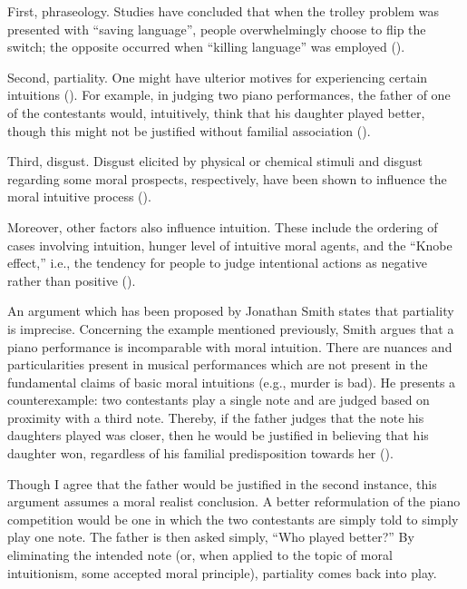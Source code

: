 First, phraseology. Studies have concluded that when the trolley problem was presented with “saving language”, people overwhelmingly choose to flip the switch; the opposite occurred when “killing language” was employed (\cite[p.\ 6]{bengson2013experimental}).

Second, partiality. One might have ulterior motives for experiencing certain intuitions (\cite[pp.\ 343–346]{sinnott2006moral}). For example, in judging two piano performances, the father of one of the contestants would, intuitively, think that his daughter played better, though this might not be justified without familial association (\cite[p.\ 343]{sinnott2006moral}).

Third, disgust. Disgust elicited by physical or chemical stimuli and disgust regarding some moral prospects, respectively, have been shown to influence the moral intuitive process (\cite[p.\ 8]{tao2022effects}).

Moreover, other factors also influence intuition. These include the ordering of cases involving intuition, hunger level of intuitive moral agents, and the “Knobe effect,” i.e., the tendency for people to judge intentional actions as negative rather than positive (\cites{swain2008instability}[p.\ 1]{danziger2011extraneous}).

An argument which has been proposed by Jonathan Smith states that partiality is imprecise. Concerning the example mentioned previously, Smith argues that a piano performance is incomparable with moral intuition. There are nuances and particularities present in musical performances which are not present in the fundamental claims of basic moral intuitions (e.g., murder is bad). He presents a counterexample: two contestants play a single note and are judged based on proximity with a third note. Thereby, if the father judges that the note his daughters played was closer, then he would be justified in believing that his daughter won, regardless of his familial predisposition towards her (\cite[p.\ 77]{smith2010sinnott}).

Though I agree that the father would be justified in the second instance, this argument assumes a moral realist conclusion. A better reformulation of the piano competition would be one in which the two contestants are simply told to simply play one note. The father is then asked simply, “Who played better?” By eliminating the intended note (or, when applied to the topic of moral intuitionism, some accepted moral principle), partiality comes back into play. 

